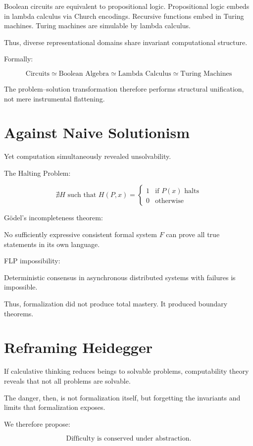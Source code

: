 \documentclass[11pt,openany]{book}
\begin{document}
Boolean circuits are equivalent to propositional logic.
Propositional logic embeds in lambda calculus via Church encodings.
Recursive functions embed in Turing machines.
Turing machines are simulable by lambda calculus.

Thus, diverse representational domains share invariant computational structure.

Formally:

\[
\text{Circuits} \simeq \text{Boolean Algebra} \simeq \text{Lambda Calculus} \simeq \text{Turing Machines}
\]

The problem--solution transformation therefore performs structural unification,
not mere instrumental flattening.

\section{Against Naive Solutionism}

Yet computation simultaneously revealed unsolvability.

The Halting Problem:

\[
\nexists H \text{ such that } H(P, x) = 
\begin{cases}
1 & \text{if } P(x) \text{ halts} \\
0 & \text{otherwise}
\end{cases}
\]

Gödel's incompleteness theorem:

No sufficiently expressive consistent formal system $F$ can prove all true statements in its own language.

FLP impossibility:

Deterministic consensus in asynchronous distributed systems with failures is impossible.

Thus, formalization did not produce total mastery.
It produced boundary theorems.

\section{Reframing Heidegger}

If calculative thinking reduces beings to solvable problems,
computability theory reveals that not all problems are solvable.

The danger, then, is not formalization itself,
but forgetting the invariants and limits that formalization exposes.

We therefore propose:

\[
\text{Difficulty is conserved under abstraction.}
\]
\end{document}
